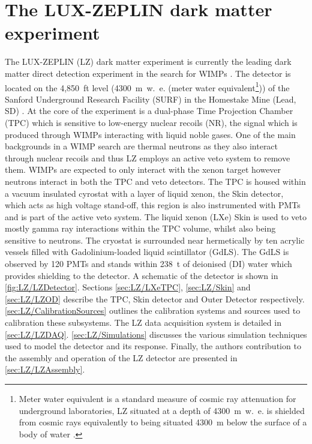 \chapter{The LUX-ZEPLIN dark matter experiment}\label{chap:LZExperiment}
The LUX-ZEPLIN (LZ) dark matter experiment is currently the leading dark matter direct detection experiment in the search for WIMPs \cite{LZ:2024zvo}. The detector is located on the 4,850~ft level (4300~m~w.~e. (meter water equivalent\footnote{Meter water equivalent is a standard measure of cosmic ray attenuation for underground laboratories, LZ situated at a depth of 4300~m~w.~e. is shielded from cosmic rays equivalently to being situated 4300~m below the surface of a body of water \cite{Grieder:2001ct}.})) of the Sanford Underground Research Facility (SURF) in the Homestake Mine (Lead, SD) \cite{LZNIMA}. At the core of the experiment is a dual-phase Time Projection Chamber (TPC) which is sensitive to low-energy nuclear recoils (NR), the signal which is produced through WIMPs interacting with liquid noble gases. One of the main backgrounds in a WIMP search are thermal neutrons as they also interact through nuclear recoils and thus LZ employs an active veto system to remove them. WIMPs are expected to only interact with the xenon target however neutrons interact in both the TPC and veto detectors.
The TPC is housed within a vacuum insulated cyrostat with a layer of liquid xenon, the Skin detector, which acts as high voltage stand-off, this region is also instrumented with PMTs and is part of the active veto system. The liquid xenon (LXe) Skin is used to veto mostly gamma ray interactions within the TPC volume, whilst also being sensitive to neutrons. The cryostat is surrounded near hermetically by ten acrylic vessels filled with Gadolinium-loaded liquid scintillator (GdLS). The GdLS is observed by 120 PMTs and stands within 238~t of deionised (DI) water which provides shielding to the detector. A schematic of the detector is shown in \autoref{fig:LZ/LZDetector}. 
Sections \ref{sec:LZ/LXeTPC}, \ref{sec:LZ/Skin} and \ref{sec:LZ/LZOD} describe the TPC, Skin detector and Outer Detector respectively. \autoref{sec:LZ/CalibrationSources} outlines the calibration systems and sources used to calibration these subsystems. The LZ data acquisition system is detailed in \autoref{sec:LZ/LZDAQ}. \autoref{sec:LZ/Simulations} discusses the various simulation techniques used to model the detector and its response. Finally, the authors contribution to the assembly and operation of the LZ detector are presented in \autoref{sec:LZ/LZAssembly}.

